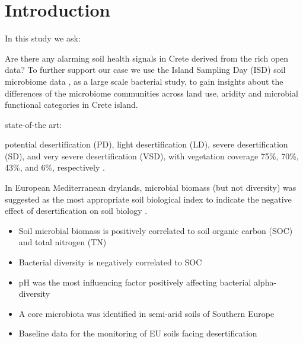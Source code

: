 \documentclass[a4paper,12pt]{article}
\begin{document}
\section{Introduction}\label{intro_idea}


In this study we ask: 

Are there any alarming soil health signals in Crete derived from the rich open data?
To further support our case we use the
Island Sampling Day (ISD) soil microbiome data \parencite{holm2025first},
as a large scale bacterial study, to gain insights about the differences of the
microbiome communities across land use, aridity and microbial functional categories in Crete island.


state-of-the art: 


potential desertification (PD), light desertification (LD), 
severe desertification (SD), and  very severe desertification (VSD), 
with vegetation coverage 75\%, 70\%, 43\%, and 6\%, respectively \parencite{Fan2020Soil}.


\bigbreak

In European Mediterranean drylands, microbial biomass (but not diversity) was suggested as 
the most appropriate soil biological index to indicate the negative effect of desertification 
on soil biology \parencite{Valentina2022Soil}.



\begin{itemize}
    \item Soil microbial biomass is positively correlated to soil organic carbon (SOC) and total nitrogen (TN)
    \item Bacterial diversity is negatively correlated to SOC
    \item pH was the most influencing factor positively affecting bacterial alpha-diversity
    \item A core microbiota was identified in semi-arid soils of Southern Europe %
    \item Baseline data for the monitoring of EU soils facing desertification
\end{itemize}


\bigbreak
\end{document}
